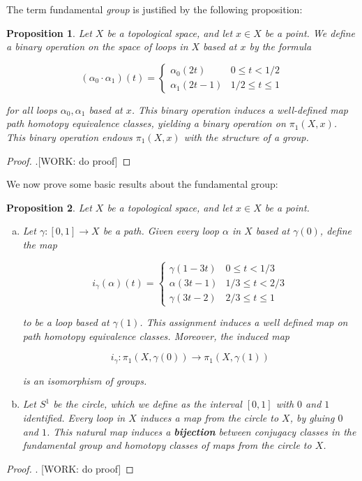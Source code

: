 \documentclass{article}
\newtheorem{proposition}{Proposition}[section]
\theoremstyle{definition}
\numberwithin{figure}{section}
\begin{document}
The term fundamental \textit{group} is justified by the following proposition:

\begin{proposition} Let $X$ be a topological space, and let $x\in X$ be a point. We define a binary operation on the space of loops in $X$ based at $x$ by the formula 

$$(\alpha_0\cdot \alpha_1)(t)=
\begin{cases}
\alpha_0(2t) & 0\leq t < 1/2\\
\alpha_1(2t-1) & 1/2\leq t \leq 1
\end{cases}$$

for all loops $\alpha_0,\alpha_1$ based at $x$. This binary operation induces a well-defined map path homotopy equivalence classes, yielding a binary operation on $\pi_1(X,x)$. This binary operation endows $\pi_1(X,x)$ with the structure of a group.
\end{proposition}
\begin{proof}.[WORK: do proof]
\end{proof}

We now prove some basic results about the fundamental group:

\begin{proposition} Let $X$ be a topological space, and let $x\in X$ be a point.
\begin{enumerate}[(a)]
\item Let $\gamma:[0,1]\to X$ be a path. Given every loop $\alpha$ in $X$ based at $\gamma(0)$, define the map

$$i_\gamma(\alpha)(t)=
\begin{cases}
\gamma(1-3t) & 0\leq t < 1/3 \\
\alpha(3t-1) & 1/3 \leq t <2/3 \\
\gamma(3t-2) & 2/3 \leq t \leq 1
\end{cases}$$

to be a loop based at $\gamma(1)$. This assignment induces a well defined map on path homotopy equivalence classes. Moreover, the induced map

\begin{equation*}
i_\gamma: \pi_1(X,\gamma(0))\xrightarrow{}\pi_1(X,\gamma(1))
\end{equation*}

is an isomorphism of groups.

\item Let $S^1$ be the circle, which we define as the interval $[0,1]$ with $0$ and $1$ identified. Every loop in $X$ induces a map from the circle to $X$, by gluing $0$ and $1$. This natural map induces a \textbf{bijection} between conjugacy classes in the fundamental group and homotopy classes of maps from the circle to $X$.

\end{enumerate}
\end{proposition}
\begin{proof}. [WORK: do proof]
\end{proof}
\end{document}

